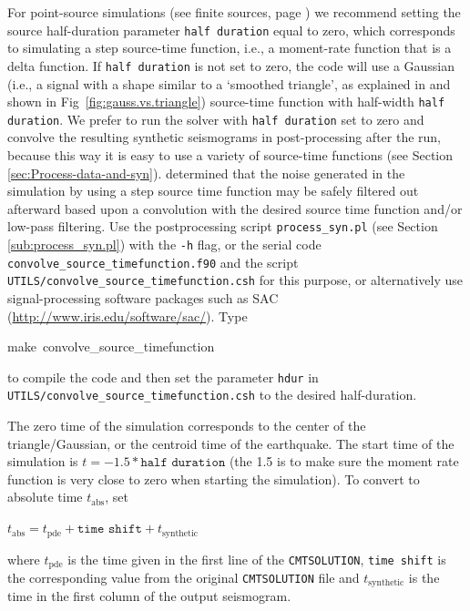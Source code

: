 \documentclass[oneside,english]{book}
\newenvironment{lyxcode}
{\begin{list}{}{
\setlength{\rightmargin}{\leftmargin}
\setlength{\listparindent}{0pt}%
\raggedright
\setlength{\itemsep}{0pt}
\setlength{\parsep}{0pt}
\normalfont\ttfamily}%
 \item[]}
{\end{list}}
\newcommand{\urlwithparentheses}[1]{(\url{#1})}
\begin{document}
\begin{itemize}
\item For point-source simulations (see finite sources, page \pageref{To-simulate-a})
we recommend setting the source half-duration parameter \texttt{half
duration} equal to zero, which corresponds to simulating a step source-time
function, i.e., a moment-rate function that is a delta function. If
\texttt{half duration} is not set to zero, the code will use a Gaussian
(i.e., a signal with a shape similar to a `smoothed triangle', as
explained in \citet{KoTr02a} and shown in Fig~\ref{fig:gauss.vs.triangle})
source-time function with half-width \texttt{half duration}. We prefer
to run the solver with \texttt{half duration} set to zero and convolve
the resulting synthetic seismograms in post-processing after the run,
because this way it is easy to use a variety of source-time functions
(see Section \ref{sec:Process-data-and-syn}). \citet{KoTr02a} determined
that the noise generated in the simulation by using a step source
time function may be safely filtered out afterward based upon a convolution
with the desired source time function and/or low-pass filtering. Use
the postprocessing script \texttt{process\_syn.pl} (see Section \ref{sub:process_syn.pl})
with the \texttt{-h} flag, or the serial code \texttt{convolve\_source\_timefunction.f90}
and the script \texttt{UTILS/convolve\_source\_timefunction.csh} for
this purpose, or alternatively use signal-processing software packages
such as SAC \urlwithparentheses{http://www.iris.edu/software/sac/}. Type

\begin{lyxcode}
make~convolve\_source\_timefunction
\end{lyxcode}
to compile the code and then set the parameter \texttt{hdur} in \texttt{UTILS/convolve\_source\_timefunction.csh}
to the desired half-duration.

\item The zero time of the simulation corresponds to the center of the triangle/Gaussian,
or the centroid time of the earthquake. The start time of the simulation
is $t=-1.5*\texttt{half duration}$ (the 1.5 is to make sure the moment
rate function is very close to zero when starting the simulation).
To convert to absolute time $t_{\mathrm{abs}}$, set

\begin{lyxcode}
$t_{\mathrm{abs}}=t_{\mathrm{pde}}+\texttt{time shift}+t_{\mathrm{synthetic}}$
\end{lyxcode}
where $t_{\mathrm{pde}}$ is the time given in the first line of the
\texttt{CMTSOLUTION}, \texttt{time shift} is the corresponding value
from the original \texttt{CMTSOLUTION} file and $t_{\mathrm{synthetic}}$
is the time in the first column of the output seismogram.

\end{itemize}
\end{document}
